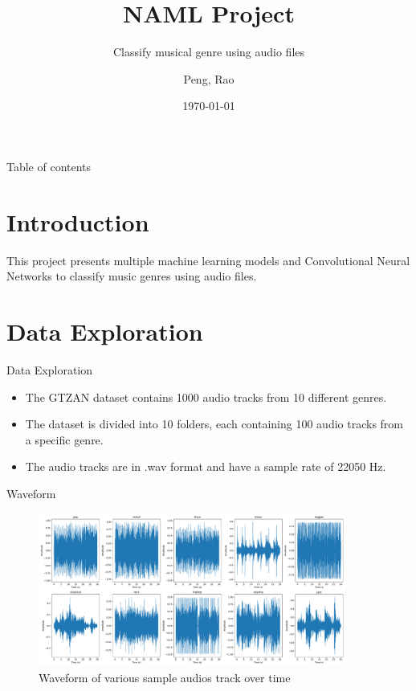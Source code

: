 \documentclass{beamer}
\title{NAML Project}
\subtitle{Classify musical genre using audio files}
\author{Peng, Rao}
\date{\today}
\begin{document}
\begin{frame}
  \maketitle
\end{frame}

\begin{frame}{Table of contents}
  \tableofcontents
\end{frame}

\section{Introduction}
\begin{frame}{}
  This project presents multiple machine learning models and Convolutional Neural Networks to classify music genres using audio files.
\end{frame}

\section{Data Exploration}
\begin{frame}{Data Exploration}
  \begin{itemize}
    \item The GTZAN dataset contains 1000 audio tracks from 10 different genres.
    \item The dataset is divided into 10 folders, each containing 100 audio tracks from a specific genre.
    \item The audio tracks are in .wav format and have a sample rate of 22050 Hz.
  \end{itemize}
\end{frame}

\begin{frame}{Waveform}

  \begin{figure}
    \centering
    \includegraphics[width=0.9\textwidth]{images/waveform.pdf}
    \caption{Waveform of various sample audios track over time}
    \label{fig:waveform}
  \end{figure}
\end{frame}
\end{document}
